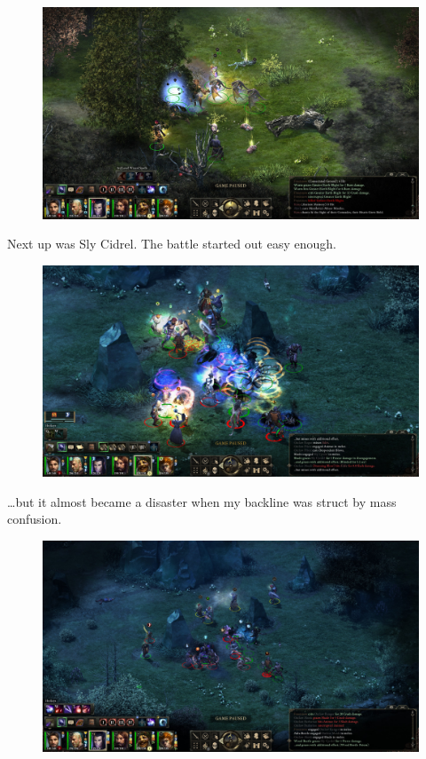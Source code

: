 \documentclass{article}
\begin{document}
\begin{figure}
\includegraphics[scale=0.33]{files/blog/2018_11_25_pillars_of_eternity_path_of_the_damned_act_ii/2018_11_25_dweller_end.jpg}
\end{figure}

Next up was Sly Cidrel.  The battle started out easy enough.

\begin{figure}
\includegraphics[scale=0.33]{files/blog/2018_11_25_pillars_of_eternity_path_of_the_damned_act_ii/2018_11_25_slycidrel_begin.jpg}
\end{figure}

\ldots but it almost became a disaster when my backline was struct by mass confusion.

\begin{figure}
\includegraphics[scale=0.33]{files/blog/2018_11_25_pillars_of_eternity_path_of_the_damned_act_ii/2018_11_25_slycidrel_mid.jpg}
\end{figure}
\end{document}

